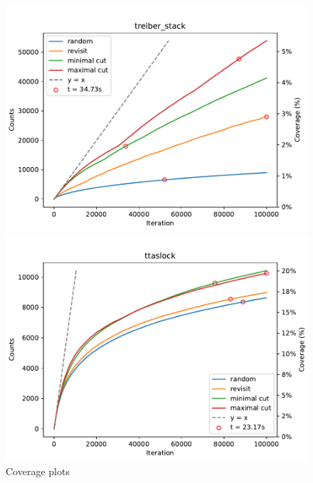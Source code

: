 \begin{figure}[h!]
	\begin{minipage}{0.45\textwidth}
		\centering
		\includegraphics[width=\textwidth]{figure/genmc/treiber_stack.pdf}
	\end{minipage}
	\hfill
	\begin{minipage}{0.45\textwidth}
		\centering
		\includegraphics[width=\textwidth]{figure/genmc/ttaslock.pdf}
	\end{minipage}

	\caption{Coverage plots}
	\label{genmc:coverage}
\end{figure}




